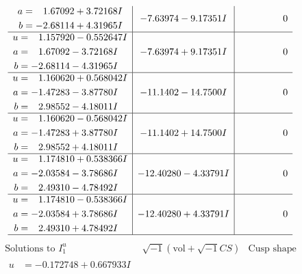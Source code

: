 \documentclass[1p]{elsarticle_modified}
\theoremstyle{definition}
\newcommand{\I}{\sqrt{-1}}
\begin{document}
$$\begin{array}{c|c|c}
\begin{aligned}
a &= \phantom{-}1.67092 + 3.72168 I \\
b &= -2.68114 + 4.31965 I\end{aligned}
 & -7.63974 - 9.17351 I & \phantom{-0.000000 } 0 \\ \hline\begin{aligned}
u &= \phantom{-}1.157920 - 0.552647 I \\
a &= \phantom{-}1.67092 - 3.72168 I \\
b &= -2.68114 - 4.31965 I\end{aligned}
 & -7.63974 + 9.17351 I & \phantom{-0.000000 } 0 \\ \hline\begin{aligned}
u &= \phantom{-}1.160620 + 0.568042 I \\
a &= -1.47283 - 3.87780 I \\
b &= \phantom{-}2.98552 - 4.18011 I\end{aligned}
 & -11.1402 - 14.7500 I & \phantom{-0.000000 } 0 \\ \hline\begin{aligned}
u &= \phantom{-}1.160620 - 0.568042 I \\
a &= -1.47283 + 3.87780 I \\
b &= \phantom{-}2.98552 + 4.18011 I\end{aligned}
 & -11.1402 + 14.7500 I & \phantom{-0.000000 } 0 \\ \hline\begin{aligned}
u &= \phantom{-}1.174810 + 0.538366 I \\
a &= -2.03584 - 3.78686 I \\
b &= \phantom{-}2.49310 - 4.78492 I\end{aligned}
 & -12.40280 - 4.33791 I & \phantom{-0.000000 } 0 \\ \hline\begin{aligned}
u &= \phantom{-}1.174810 - 0.538366 I \\
a &= -2.03584 + 3.78686 I \\
b &= \phantom{-}2.49310 + 4.78492 I\end{aligned}
 & -12.40280 + 4.33791 I & \phantom{-0.000000 } 0\\
 \hline 
 \end{array}$$\newpage$$\begin{array}{c|c|c}  
\text{Solutions to }I^u_{1}& \I (\text{vol} + \sqrt{-1}CS) & \text{Cusp shape}\\
 \hline 
\begin{aligned}
u &= -0.172748 + 0.667933 I \\

\end{aligned}
\end{array}$$
\end{document}
